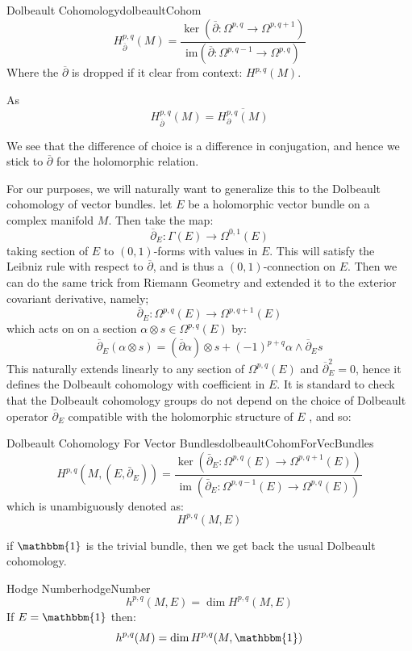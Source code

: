 \documentclass{ut-thesis}
\newcommand{\im}{{\operatorname{im}}}
\begin{document}
\begin{defn}{Dolbeault Cohomology}{dolbeaultCohom}
  \[
H_{\overline{\partial}}^{p,q}(M) = \frac{\ker(\overline{\partial}: \Omega^{p,q} \to \Omega^{p,q+1})}{\text{im}(\overline{\partial}: \Omega^{p,q-1} \to \Omega^{p,q})}
\]
Where the $\overline{\partial}$ is dropped if it clear from context: $H^{p,q}(M)$.
\end{defn}

As
\[
  H_{\overline{\partial}}^{p,q}(M) = \overline{H_{\partial}^{p,q}(M)}
\]

We see that the difference of choice is a difference in conjugation, and hence we stick to
$\overline{\partial}$ for the holomorphic relation.

For our purposes, we will naturally want to generalize this to the Dolbeault cohomology of vector bundles. let
$E$ be a holomorphic vector bundle on a complex manifold $M$. Then take the map:
\[
  \overline{\partial}_E: \Gamma(E) \to \Omega^{0,1}(E)
\]
taking section of $E$ to $(0,1)$-forms with values in $E$. This will satisfy the Leibniz rule with respect to
$\overline{\partial}$, and is thus a $(0,1)$-connection on $E$. Then we can do the same trick from Riemann
Geometry and extended it to the exterior covariant derivative, namely;
\[
  \overline{\partial}_E: \Omega^{p,q}(E) \to \Omega^{p, q+1}(E)
\]
which acts on on a section $\alpha \otimes s \in \Omega^{p,q}(E)$ by:
\[
  \overline{\partial}_E(\alpha\otimes s) = (\overline{\partial}\alpha) \otimes s + (-1)^{p+q}\alpha \wedge
  \overline{\partial}_E s
\]
This naturally extends linearly to any section of $\Omega^{p,q}(E)$ and $\overline{\partial}_E^2 = 0$, hence
it defines the Dolbeault cohomology with coefficient in $E$. It is standard to check that the Dolbeault
cohomology groups do not depend on the choice of Dolbeault operator
$\overline{\partial}_E$ compatible with the holomorphic structure of $E$
\cite{gallierComplexAlgebraicGeometry2011}, and so:
\begin{defn}{Dolbeault Cohomology For Vector Bundles}{dolbeaultCohomForVecBundles}
  \[
H^{p,q}(M,(E,\bar{\partial}_E)) = \frac{\ker(\bar{\partial}_E : \Omega^{p,q}(E) \to \Omega^{p,q+1}(E))}{\im(\bar{\partial}_E : \Omega^{p,q-1}(E) \to \Omega^{p,q}(E))}
\]
which is unambiguously denoted as:
\[
  H^{p,q}(M,E)
\]
\end{defn}
if $\mathbbm{1}$ is the trivial bundle, then we get back the usual Dolbeault cohomology.

\begin{defn}{Hodge Number}{hodgeNumber}
  \[
    h^{p,q}(M,E) = \dim H^{p,q}(M,E)
  \]
  If $E = \mathbbm{1}$ then:
  \[
    h^{p,q}(M) = \dim H^{p,q}(M,\mathbbm{1})
  \]
\end{defn}
\end{document}
